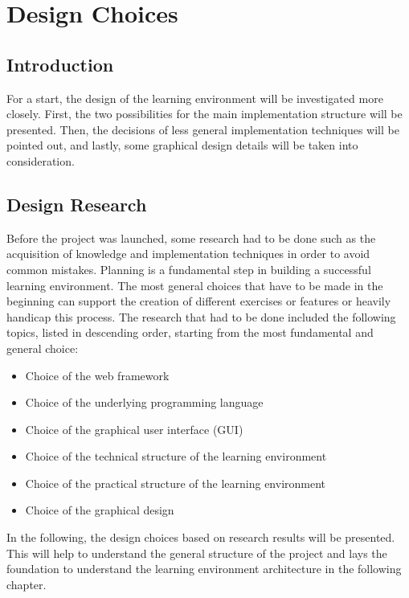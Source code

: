 \chapter{Design Choices}
\label{chapter:design}

\section{Introduction}
\label{section:introduction}
For a start, the design of the learning environment will be investigated more closely. First, the two possibilities for the main implementation structure will be presented. Then, the decisions of less general implementation techniques will be pointed out, and lastly, some graphical design details will be taken into consideration.

\section{Design Research}
\label{section:designchoice}
Before the project was launched, some research had to be done such as the acquisition of knowledge and implementation techniques in order to avoid common mistakes. Planning is a fundamental step in building a successful learning environment. The most general choices that have to be made in the beginning can support the creation of different exercises or features or heavily handicap this process. The research that had to be done included the following topics, listed in descending order, starting from the most fundamental and general choice: 

\begin{itemize}
\item Choice of the web framework
\item Choice of the underlying programming language
\item Choice of the graphical user interface (GUI)
\item Choice of the technical structure of the learning environment
\item Choice of the practical structure of the learning environment
\item Choice of the graphical design
\end{itemize}
In the following, the design choices based on research results will be presented. This will help to understand the general structure of the project and lays the foundation to understand the learning environment architecture in the following chapter.

